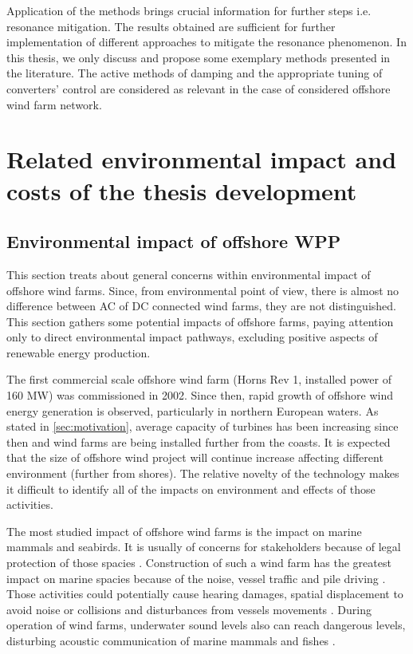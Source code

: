 \documentclass[a4paper,11pt,twoside,openright]{report}
\begin{document}
Application of the methods brings crucial information for further steps i.e. resonance mitigation. The results obtained are sufficient for further implementation of different approaches to mitigate the resonance phenomenon. In this thesis, we only discuss and propose some exemplary methods presented in the literature. The active methods of damping and the appropriate tuning of converters' control are considered as relevant in the case of considered offshore wind farm network.

\chapter{Related environmental impact and costs of the thesis development}
\section{Environmental impact of offshore WPP}
This section treats about general concerns within environmental impact of offshore wind farms. Since, from environmental point of view, there is almost no difference between AC of DC connected wind farms, they are not distinguished. This section gathers some potential impacts of offshore farms, paying attention only to direct environmental impact pathways, excluding positive aspects of renewable energy production.

The first commercial scale offshore wind farm (Horns Rev 1, installed power of 160 MW) was commissioned in 2002. Since then, rapid growth of offshore wind energy generation is observed, particularly in northern European waters. As stated in \ref{sec:motivation}, average capacity of turbines has been increasing since then and wind farms are being installed further from the coasts. It is expected that the size of offshore wind project will continue increase \cite{offshorestat2014} affecting different environment (further from shores). The relative novelty of the technology makes it difficult to identify all of the impacts on environment and effects of those activities.

The most studied impact of offshore wind farms is the impact on marine mammals and seabirds. It is usually of concerns for stakeholders because of legal protection of those spacies \cite{bailey2014}. Construction of such a wind farm has the greatest impact on marine spacies because of the noise, vessel traffic and pile driving \cite{dolman2010}. Those activities could potentially cause hearing damages, spatial displacement to avoid noise or collisions and disturbances from vessels movements \cite{madsen2006}.  During operation of wind farms, underwater sound levels also can reach dangerous levels, disturbing acoustic communication of marine mammals \cite{tougaard2009} and fishes \cite{wahlberg2005}. 
\end{document}
